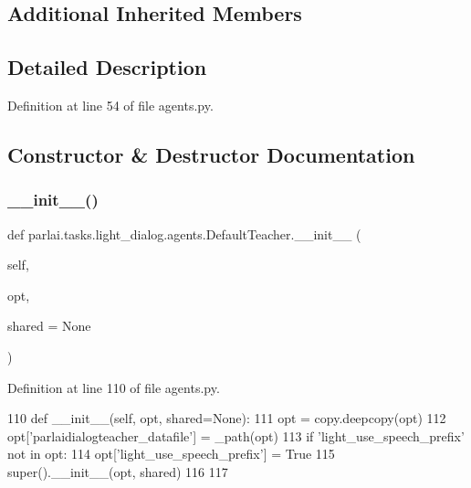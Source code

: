\subsection*{Additional Inherited Members}


\subsection{Detailed Description}


Definition at line 54 of file agents.\+py.



\subsection{Constructor \& Destructor Documentation}
\mbox{\label{classparlai_1_1tasks_1_1light__dialog_1_1agents_1_1DefaultTeacher_a1d47fda7e697c78203a822b2ce107b19}} 
\subsubsection{\texorpdfstring{\+\_\+\+\_\+init\+\_\+\+\_\+()}{\_\_init\_\_()}}
{\footnotesize\ttfamily def parlai.\+tasks.\+light\+\_\+dialog.\+agents.\+Default\+Teacher.\+\_\+\+\_\+init\+\_\+\+\_\+ (\begin{DoxyParamCaption}\item[{}]{self,  }\item[{}]{opt,  }\item[{}]{shared = {\ttfamily None} }\end{DoxyParamCaption})}



Definition at line 110 of file agents.\+py.


\begin{DoxyCode}
110     \textcolor{keyword}{def }\_\_init\_\_(self, opt, shared=None):
111         opt = copy.deepcopy(opt)
112         opt[\textcolor{stringliteral}{'parlaidialogteacher\_datafile'}] = \_path(opt)
113         \textcolor{keywordflow}{if} \textcolor{stringliteral}{'light\_use\_speech\_prefix'} \textcolor{keywordflow}{not} \textcolor{keywordflow}{in} opt:
114             opt[\textcolor{stringliteral}{'light\_use\_speech\_prefix'}] = \textcolor{keyword}{True}
115         super().\_\_init\_\_(opt, shared)
116 
117 
\end{DoxyCode}


